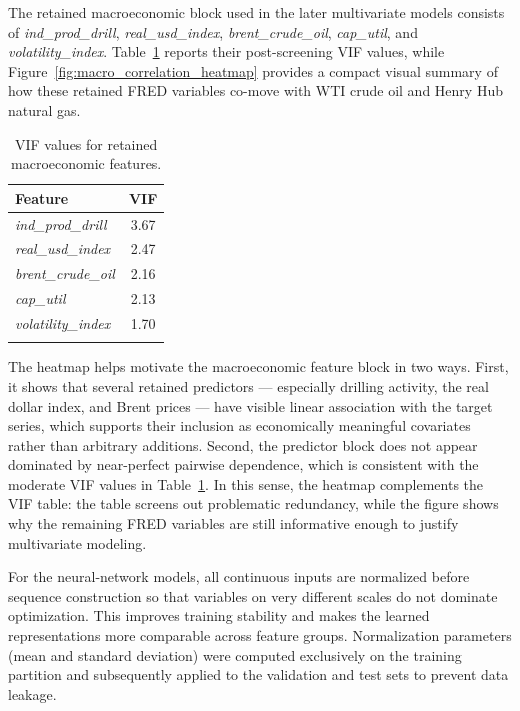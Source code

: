 \documentclass[pdflatex,sn-mathphys-num]{sn-jnl}%
\theoremstyle{thmstyleone}%
\theoremstyle{thmstyletwo}%
\theoremstyle{thmstylethree}%
\begin{document}
The retained macroeconomic block used in the later multivariate models consists of \textit{ind\_prod\_drill}, \textit{real\_usd\_index}, \textit{brent\_crude\_oil}, \textit{cap\_util}, and \textit{volatility\_index}. Table~\ref{tab:vif_macro_features} reports their post-screening VIF values, while Figure~\ref{fig:macro_correlation_heatmap} provides a compact visual summary of how these retained FRED variables co-move with WTI crude oil and Henry Hub natural gas.

\begin{table}[t]
\centering
\caption{VIF values for retained macroeconomic features.}
\label{tab:vif_macro_features}
\begin{tabular}{lc}
\toprule
Feature & VIF \\
\midrule
\textit{ind\_prod\_drill} & 3.67 \\
\textit{real\_usd\_index} & 2.47 \\
\textit{brent\_crude\_oil} & 2.16 \\
\textit{cap\_util} & 2.13 \\
\textit{volatility\_index} & 1.70 \\
\botrule
\end{tabular}
\end{table}

The heatmap helps motivate the macroeconomic feature block in two ways. First, it shows that several retained predictors --- especially drilling activity, the real dollar index, and Brent prices --- have visible linear association with the target series, which supports their inclusion as economically meaningful covariates rather than arbitrary additions. Second, the predictor block does not appear dominated by near-perfect pairwise dependence, which is consistent with the moderate VIF values in Table~\ref{tab:vif_macro_features}. In this sense, the heatmap complements the VIF table: the table screens out problematic redundancy, while the figure shows why the remaining FRED variables are still informative enough to justify multivariate modeling.

For the neural-network models, all continuous inputs are normalized before sequence construction so that variables on very different scales do not dominate optimization. This improves training stability and makes the learned representations more comparable across feature groups. Normalization parameters (mean and standard deviation) were computed exclusively on the training partition and subsequently applied to the validation and test sets to prevent data leakage.
\end{document}

